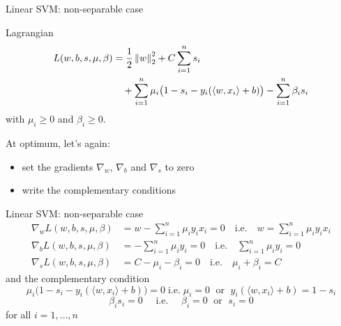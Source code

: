 \documentclass[xcolor={usenames,dvipsnames}]{beamer}
\begin{document}
\begin{frame}{Linear SVM: non-separable case}
  \begin{block}{Lagrangian}
  \begin{align*}
    L(w, b, s, \mu, \beta) &= \frac 12 \left\| w \right\|_2^2 + C \sum_{i=1}^n 
    s_i \\ 
    & \quad + \sum_{i=1}^n \mu_i \big(1 - s_i - y_i( \langle {w, x_i} \rangle  + b) \big) 
    - \sum_{i=1}^n \beta_i s_i
  \end{align*}
  with $\mu_i\geq 0$ and $\beta_i \geq 0$.
  \end{block}
  
  At optimum, let's again:
  \begin{itemize}
    \item set the gradients $\nabla_w$, $\nabla_b$ and $\nabla_s$ to zero
    \item write the complementary conditions
  \end{itemize}
\end{frame}


\begin{frame}{Linear SVM: non-separable case}
    \begin{align*}
      \nabla_w L(w, b, s, \mu, \beta) &= w - \sum_{i=1}^n \mu_i y_i x_i = 0 \quad \text{i.e.} \quad w = \sum_{i=1}^n \mu_i y_i x_i \\
      \nabla_b L(w, b, s, \mu, \beta) &= -\sum_{i=1}^n \mu_i y_i = 0 \quad \text{i.e.} \quad \sum_{i=1}^n \mu_i y_i = 0 \\
      \nabla_s L(w, b, s, \mu, \beta) &= C - \mu_i - \beta_i = 0 \quad \text{i.e.} \quad \mu_i + \beta_i = C
    \end{align*}
    and the complementary condition
    \begin{equation*}
      \mu_i \big(1 - s_i - y_i(\langle {w, x_i} \rangle  + b) \big) = 0 \; \text{i.e.} \; \mu_i = 0 \; \text{ or } \; y_i(\langle {w, x_i} \rangle + b) = 1 - s_i
    \end{equation*}
    \begin{equation*}
      \beta_i s_i = 0 \quad \text{ i.e. } \quad \beta_i = 0 \; \text{ or } \; s_i = 0
    \end{equation*}
    for all $i=1, \ldots, n$
\end{frame}
\end{document}
